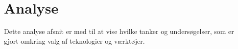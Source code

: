 \chapter{Analyse}
 Dette analyse afsnit er med til at vise hvilke tanker og undersøgelser, som er gjort omkring valg af teknologier og værktøjer.

